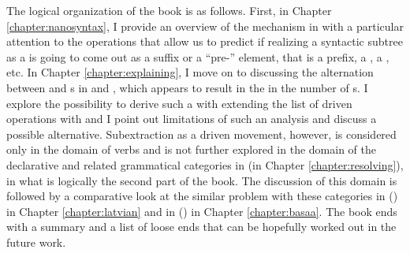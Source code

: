 The logical organization of the book is as follows. First, in Chapter \ref{chapter:nanosyntax}, I provide an overview of the  mechanism in  with a particular attention to the operations that allow us to predict if realizing a syntactic subtree as a  is going to come out as a suffix or a ``pre-'' element, that is a prefix, a , a , etc. In Chapter \ref{chapter:explaining}, I move on to discussing the alternation between  and  s in  and , which appears to result in the  in the number of s. I explore the possibility to derive such a  with extending the list of  driven operations with  and I point out limitations of such an analysis and discuss a possible alternative.  Subextraction as a  driven movement, however, is considered  only in the domain of  verbs  and is not further explored in the domain of the declarative  and related grammatical categories in  (in Chapter \ref{chapter:resolving}), in what is logically the second part of the book. The discussion of this domain is followed by a comparative look at the similar problem with these categories in  () in Chapter \ref{chapter:latvian} and in  () in Chapter \ref{chapter:basaa}. The book ends with a summary and a list of loose ends that can be hopefully worked out in the future work.





















